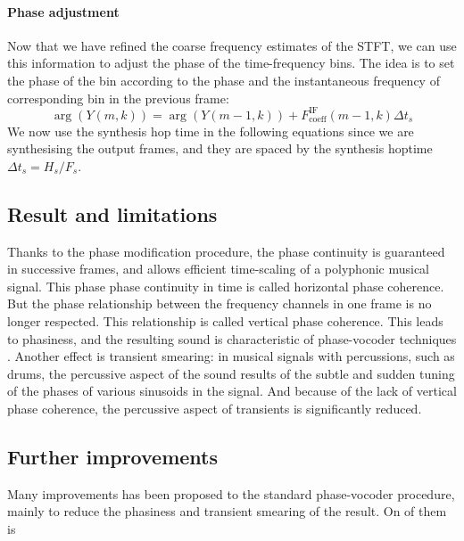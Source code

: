 \documentclass[letterpaper]{article}
\begin{document}
\paragraph{Phase adjustment}
Now that we have refined the coarse frequency estimates of the STFT, we can use
this information to adjust the phase of the time-frequency bins. The idea is to
set the phase of the bin according to the phase and the instantaneous frequency
of corresponding bin in the previous frame:
\begin{equation}
		\arg(Y(m,k))=\arg(Y(m-1,k)) + F_{\text{coeff}}^{\text{IF}}(m-1,k)\Delta t_s
\end{equation}
We now use the synthesis hop time in
the following equations since we are synthesising the output frames, and they
are spaced by the synthesis hoptime \(\Delta t_s=H_s/F_s\).

\subsection{Result and limitations}
Thanks to the phase modification procedure, the phase continuity is guaranteed
in successive frames, and allows efficient time-scaling of a polyphonic musical
signal. This phase phase continuity in time is called horizontal phase
coherence. But the phase relationship between the frequency channels in one
frame is no longer respected. This relationship is called vertical phase
coherence. This leads to phasiness, and the resulting sound is characteristic of
phase-vocoder techniques \citep{Laroche1999}. Another effect is transient
smearing: in musical signals with percussions, such as drums, the percussive
aspect of the sound results of the subtle and sudden tuning of the phases of
various sinusoids in the signal. And because of the lack of vertical phase
coherence, the percussive aspect of transients is significantly reduced.

\paragraph{}

\subsection{Further improvements}
Many improvements has been proposed to the standard phase-vocoder procedure,
mainly to reduce the phasiness and transient smearing of the result. On of
them is 
\end{document}
